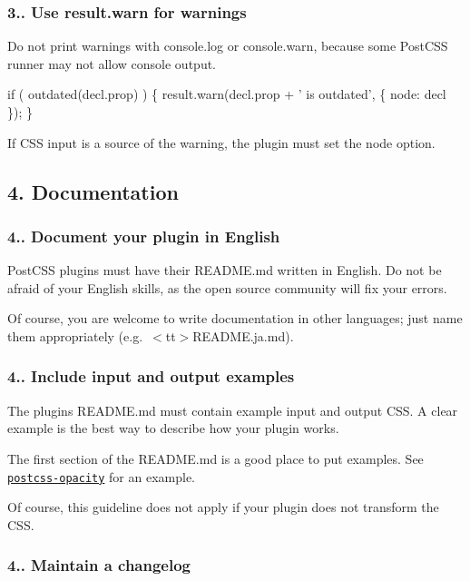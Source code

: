 \subsubsection*{3.. Use {\ttfamily result.\+warn} for warnings}

Do not print warnings with {\ttfamily console.\+log} or {\ttfamily console.\+warn}, because some Post\+C\+SS runner may not allow console output.


\begin{DoxyCode}
if ( outdated(decl.prop) ) \{
    result.warn(decl.prop + ' is outdated', \{ node: decl \});
\}
\end{DoxyCode}


If C\+SS input is a source of the warning, the plugin must set the {\ttfamily node} option.

\subsection*{4. Documentation}

\subsubsection*{4.. Document your plugin in English}

Post\+C\+SS plugins must have their {\ttfamily R\+E\+A\+D\+M\+E.\+md} written in English. Do not be afraid of your English skills, as the open source community will fix your errors.

Of course, you are welcome to write documentation in other languages; just name them appropriately (e.\+g.\+ $<$tt$>$R\+E\+A\+D\+M\+E.\+ja.\+md).

\subsubsection*{4.. Include input and output examples}

The plugin\textquotesingle{}s {\ttfamily R\+E\+A\+D\+M\+E.\+md} must contain example input and output C\+SS. A clear example is the best way to describe how your plugin works.

The first section of the {\ttfamily R\+E\+A\+D\+M\+E.\+md} is a good place to put examples. See \href{https://github.com/iamvdo/postcss-opacity}{\tt postcss-\/opacity} for an example.

Of course, this guideline does not apply if your plugin does not transform the C\+SS.

\subsubsection*{4.. Maintain a changelog}

